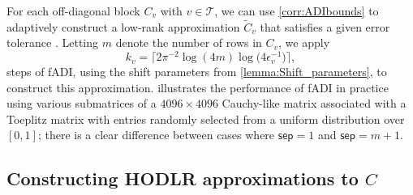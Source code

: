 \documentclass[final,reqno,onefignum,onetabnum]{siamart190516}
\newcommand{\sep}{\mathsf{sep}}
\begin{document}
For each off-diagonal block $C_v$ with $v\in \mathcal T$, we can use \cref{corr:ADIbounds} to adaptively construct a low-rank  approximation $\widetilde{C}_v$  that satisfies a given error tolerance . Letting $m$ denote the number of rows in  $C_v$, we apply
\begin{equation} \label{eq:kv}
k_v =\big\lceil 2\pi^{-2} \log( 4 m ) \log\big( 4 \epsilon^{-1}_v \big) \big\rceil,
\end{equation}
 steps of fADI, using the shift parameters from \cref{lemma:Shift_parameters}, to construct this approximation.  illustrates the performance of fADI in practice using various submatrices of a $4096 \times 4096$ Cauchy-like matrix associated with a Toeplitz matrix with entries randomly selected from a uniform distribution over $[0, 1]$; there is a clear difference between cases where $\sep = 1$ and $\sep = m +1$.
 
\subsection{Constructing HODLR approximations to $C$}
\end{document}
